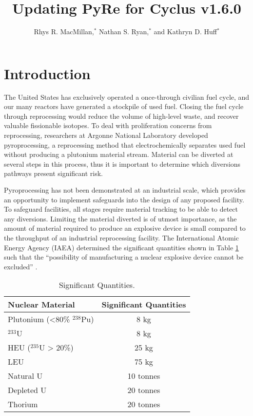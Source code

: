 \documentclass{anstrans}
\title{Updating PyRe for Cyclus v1.6.0}
\author{Rhys R. MacMillan,$^{*}$ Nathan S. Ryan,$^{*}$ and Kathryn D. Huff$^{*}$}
\institute{
$^{*}$Advanced Reactors and Fuel Cycles Group, University of Illinois, Urbana IL, rhysrm2@illinois.edu
}
\begin{document}
\section{Introduction}
The United States has exclusively operated a once-through civilian fuel cycle, and our many reactors have generated a stockpile of used fuel. Closing the fuel cycle through reprocessing would reduce the volume of high-level waste, and recover valuable fissionable isotopes. To deal with proliferation concerns from reprocessing, researchers at Argonne National Laboratory developed pyroprocessing, a reprocessing method that electrochemically separates used fuel without producing a plutonium material stream. Material can be diverted at several steps in this process, thus it is important to determine which diversions pathways present significant risk.

Pyroprocessing has not been demonstrated at an industrial scale, which provides an opportunity to implement safeguards into the design of any proposed facility. To safeguard facilities, all stages require material tracking to be able to detect any diversions. Limiting the material diverted is of utmost importance, as the amount of material required to produce an explosive device is small compared to the throughput of an industrial reprocessing facility. The International Atomic Energy Agency (IAEA) determined the significant quantities shown in Table \ref{tab:sig_quant} such that the “possibility of manufacturing a nuclear explosive device cannot be excluded” \cite{schanfein_iaea_2021}.

\begin{table}[H]
  \centering
  \caption{Significant Quantities.}
  \label{tab:sig_quant}
  \begin{tabular}{l c}
    \hline
    Nuclear Material&Significant Quantities\\
    \hline
    Plutonium (<80\% $^{238}$Pu)&8 kg\\
    $^{233}$U&8 kg\\
    HEU ($^{235}$U > 20\%)&25 kg\\
    LEU&75 kg\\
    Natural U&10 tonnes\\
    Depleted U&20 tonnes\\
    Thorium&20 tonnes\\
    \hline
  \end{tabular}
\end{table}
\end{document}
